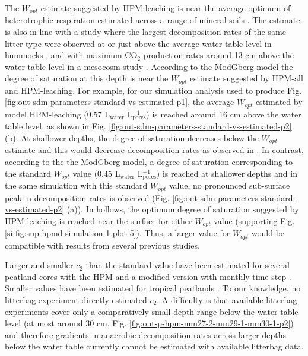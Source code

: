 \documentclass[esd, manuscript]{copernicus}
\begin{document}
The \(W_{opt}\) estimate suggested by HPM-leaching is near the average optimum of heterotrophic respiration estimated across a range of mineral soils \citep{Moyano.2013}. The estimate is also in line with a study where the largest decomposition rates of the same litter type were observed at or just above the average water table level in hummocks \citep{Belyea.1996}, and with maximum CO\(_2\) production rates around 13 cm above the water table level in a mesocosm study \citep{Blodau.2004}. According to the ModGberg model the degree of saturation at this depth is near the \(W_{opt}\) estimate suggested by HPM-all and HPM-leaching. For example, for our simulation analysis used to produce Fig. \ref{fig:out-sdm-parameters-standard-vs-estimated-p1}, the average \(W_{opt}\) estimated by model HPM-leaching (0.57 L\(_\text{water}\) L\(_\text{pores}^{-1}\)) is reached around 16 cm above the water table level, as shown in Fig. \ref{fig:out-sdm-parameters-standard-vs-estimated-p2} (b). At shallower depths, the degree of saturation decreases below the \(W_{opt}\) estimate and this would decrease decomposition rates as observed in \citet{Belyea.1996}. In contrast, according to the the ModGberg model, a degree of saturation corresponding to the standard \(W_{opt}\) value (0.45 L\(_\text{water}\) L\(_\text{pores}^{-1}\)) is reached at shallower depths and in the same simulation with this standard \(W_{opt}\) value, no pronounced sub-surface peak in decomposition rates is observed (Fig. \ref{fig:out-sdm-parameters-standard-vs-estimated-p2} (a)). In hollows, the optimum degree of saturation suggested by HPM-leaching is reached near the surface for either \(W_{opt}\) value (supporting Fig. \ref{si-fig:sup-hpmd-simulation-1-plot-5}). Thus, a larger value for \(W_{opt}\) would be compatible with results from several previous studies.

Larger and smaller \(c_2\) than the standard value have been estimated for several peatland cores with the HPM and a modified version with monthly time step \citep{Quillet.2015, Treat.2021, Treat.2022}. Smaller values have been estimated for tropical peatlands \citep{Kurnianto.2015}. To our knowledge, no litterbag experiment directly estimated \(c_2\). A difficulty is that available litterbag experiments cover only a comparatively small depth range below the water table level (at most around 30 cm, Fig. \ref{fig:out-p-hpm-mm27-2-mm29-1-mm30-1-p2}) and therefore gradients in anaerobic decomposition rates across larger depths below the water table currently cannot be estimated with available litterbag data.
\end{document}
